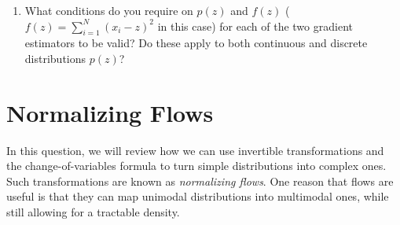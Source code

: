 \documentclass[11pt]{article}
\begin{document}
\begin{enumerate}[label=(\Alph*)]
\begin{enumerate}[label=(\roman*)]
        \item Using PyTorch and for each of these two gradient estimators, perform gradient descent using $M=\{1,10,100,1000\}$ gradient samples for $T=10$ trials. Plot the mean and variance of the final estimate for $\mu$ for each value of $M$ across the $T$ trials.
        
        \textit{You should have two graphs, one for each gradient estimator. Each of the graph should contain two plots, one for the means and one for the variances. The $x$-axis should be $M$, hence each of these plots will have four points.}
        
    \end{enumerate}
    
    \item  What conditions do you require on $p(z)$ and $f(z)$ ($f(z)=\sum^N_{i=1} (x_i - z)^2$ in this case) for each of the two gradient estimators to be valid? Do these apply to both continuous and discrete distributions $p(z)$? 

\end{enumerate} 



\newpage

\section{Normalizing Flows}

In this question, we will review how we can use invertible transformations and the change-of-variables formula to turn simple distributions into complex ones. Such transformations are known as \textit{normalizing flows}. One reason that flows are useful is that they can map unimodal distributions into multimodal ones, while still allowing for a tractable density.
\end{document}
